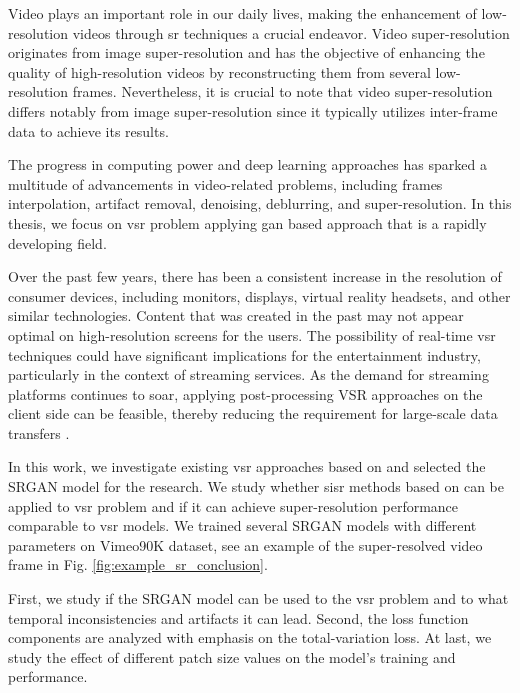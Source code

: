 \documentclass[conference]{IEEEtran}
\begin{document}
Video plays an important role in our daily lives, making the enhancement of low-resolution videos through \acrshort{sr} techniques a crucial endeavor. Video super-resolution originates from image super-resolution and has the objective of enhancing the quality of high-resolution videos by reconstructing them from several low-resolution frames. Nevertheless, it is crucial to note that video super-resolution differs notably from image super-resolution since it typically utilizes inter-frame data to achieve its results.

The progress in computing power and deep learning approaches has sparked a multitude of advancements in video-related problems, including frames interpolation, artifact removal, denoising, deblurring, and super-resolution. In this thesis, we focus on \acrshort{vsr} problem applying \acrshort{gan} based approach that is a rapidly developing field.

Over the past few years, there has been a consistent increase in the resolution of consumer devices, including monitors, displays, virtual reality headsets, and other similar technologies. Content that was created in the past may not appear optimal on high-resolution screens for the users. The possibility of real-time \acrshort{vsr} techniques could have significant implications for the entertainment industry, particularly in the context of streaming services. As the demand for streaming platforms continues to soar, applying post-processing VSR approaches on the client side can be feasible, thereby reducing the requirement for large-scale data transfers \cite{video_super_resolution_survey_2020}.

In this work, we investigate existing \acrshort{vsr} approaches based on  and selected the SRGAN \cite{srgan_2016} model for the research. We study whether \acrlong{sisr} methods based on  can be applied to \acrlong{vsr} problem and if it can achieve super-resolution performance comparable to \acrshort{vsr} models. We trained several SRGAN models with different parameters on Vimeo90K dataset, see an example of the super-resolved video frame in Fig. \ref{fig:example_sr_conclusion}.

First, we study if the SRGAN model can be used to the \acrshort{vsr} problem and to what temporal inconsistencies and artifacts it can lead. Second, the loss function components are analyzed with emphasis on the total-variation loss. At last, we study the effect of different patch size values on the model's training and performance.
\end{document}
